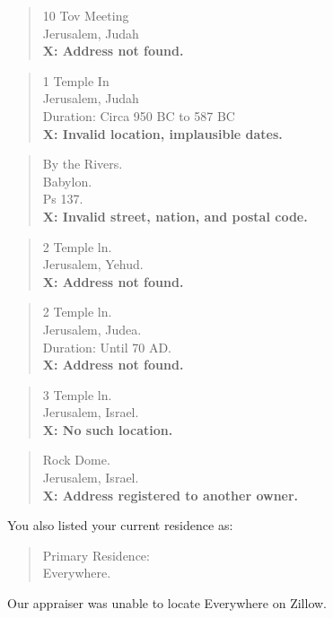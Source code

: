 {{\begin{quote}
10 Tov Meeting\\Jerusalem, Judah\\\textbf{X: Address not found.}
\end{quote}

\begin{quote}
1 Temple In\\Jerusalem, Judah\\Duration: Circa 950 BC to 587 BC\\\textbf{X: Invalid location, implausible dates.}
\end{quote}

\begin{quote}
By the Rivers.\\Babylon.\\Ps 137.\\\textbf{X: Invalid street, nation, and postal code.}
\end{quote}

\begin{quote}
2 Temple ln.\\Jerusalem, Yehud.\\\textbf{X: Address not found.}
\end{quote}

\begin{quote}
2 Temple ln.\\Jerusalem, Judea.\\Duration: Until 70 AD.\\\textbf{X: Address not found.}
\end{quote}

\begin{quote}
3 Temple ln.\\Jerusalem, Israel.\\\textbf{X: No such location.}
\end{quote}

\begin{quote}
Rock Dome.\\Jerusalem, Israel.\\\textbf{X: Address registered to another owner.}
\end{quote}

You also listed your current residence as:

\begin{quote}
Primary Residence:\\Everywhere.
\end{quote}

Our appraiser was unable to locate Everywhere on Zillow.

}}
